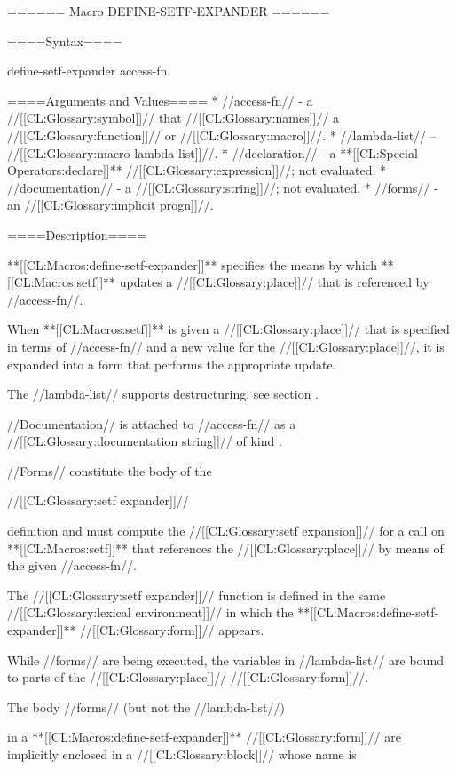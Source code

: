 ====== Macro DEFINE-SETF-EXPANDER ======

====Syntax====

\DefmacWithValuesNewline define-setf-expander {} {access-fn}

====Arguments and Values====
  * //access-fn// - a //[[CL:Glossary:symbol]]// that //[[CL:Glossary:names]]// a //[[CL:Glossary:function]]// or //[[CL:Glossary:macro]]//.
  * //lambda-list// -- //[[CL:Glossary:macro lambda list]]//.
  * //declaration// - a **[[CL:Special Operators:declare]]** //[[CL:Glossary:expression]]//; not evaluated.
  * //documentation// - a //[[CL:Glossary:string]]//; not evaluated.
  * //forms// - an //[[CL:Glossary:implicit progn]]//.

====Description====

**[[CL:Macros:define-setf-expander]]** specifies the means by which **[[CL:Macros:setf]]** updates a //[[CL:Glossary:place]]// that is referenced by //access-fn//.

When **[[CL:Macros:setf]]** is given a //[[CL:Glossary:place]]// that is specified in terms of //access-fn// and a new value for the //[[CL:Glossary:place]]//, it is expanded into a form that performs the appropriate update.

The //lambda-list// supports destructuring. see section {\secref\MacroLambdaLists}.

//Documentation// is attached to //access-fn// as a //[[CL:Glossary:documentation string]]// of kind .

//Forms// constitute the body of the

//[[CL:Glossary:setf expander]]//

definition and must compute the //[[CL:Glossary:setf expansion]]// for a call on **[[CL:Macros:setf]]** that references the //[[CL:Glossary:place]]// by means of the given //access-fn//.

The //[[CL:Glossary:setf expander]]// function is defined in the same //[[CL:Glossary:lexical environment]]// in which the **[[CL:Macros:define-setf-expander]]** //[[CL:Glossary:form]]// appears.

While //forms// are being executed, the variables in //lambda-list// are bound to parts of the //[[CL:Glossary:place]]// //[[CL:Glossary:form]]//.

The body //forms// (but not the //lambda-list//)

in a **[[CL:Macros:define-setf-expander]]** //[[CL:Glossary:form]]// are implicitly enclosed in a //[[CL:Glossary:block]]// whose name is

